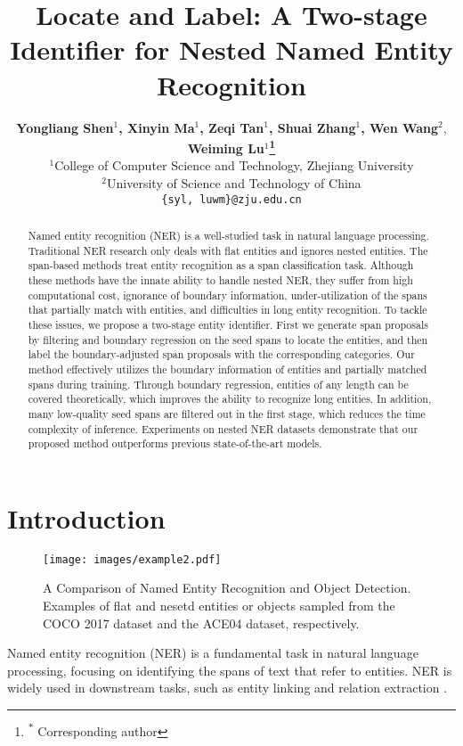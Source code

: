 \documentclass[11pt,a4paper]{article}
\title{Locate and Label: A Two-stage Identifier for Nested Named Entity Recognition}
\author{
\textbf{Yongliang Shen$^{1}$, Xinyin Ma$^{1}$, Zeqi Tan$^{1}$, Shuai Zhang$^{1}$, Wen Wang$^{2}$}, \textbf{Weiming Lu$^{1}$\thanks{\textsuperscript{$\ast$} Corresponding author}}\\
 $^{1}$College of Computer Science and Technology, Zhejiang University \\
 $^{2}$University of Science and Technology of China\\
\texttt{\{syl, luwm\}@zju.edu.cn}
}
\date{}
\begin{document}
\maketitle


\begin{abstract}

Named entity recognition (NER) is a well-studied task in natural language processing. Traditional NER research only deals with flat entities and ignores nested entities. The span-based methods treat entity recognition as a span classification task. Although these methods have the innate ability to handle nested NER, they suffer from high computational cost, ignorance of boundary information, under-utilization of the spans that partially match with entities, and difficulties in long entity recognition. To tackle these issues, we propose a two-stage entity identifier. First we generate span proposals by filtering and boundary regression on the seed spans to locate the entities, and then label the boundary-adjusted span proposals with the corresponding categories. Our method effectively utilizes the boundary information of entities and partially matched spans during training. Through boundary regression, entities of any length can be covered theoretically, which improves the ability to recognize long entities. In addition,  many low-quality seed spans are filtered out in the first stage, which reduces the time complexity of inference. Experiments on nested NER datasets demonstrate that our proposed method outperforms previous state-of-the-art models.


\end{abstract}

\section{Introduction}

\begin{figure}[h]
  \centering
  \texttt{[image: images/example2.pdf]}
  \caption{A Comparison of Named Entity Recognition and Object Detection. Examples of flat and nesetd entities or objects sampled from the COCO 2017 dataset and the ACE04 dataset, respectively.}
   \label{fig:example}
\end{figure}

Named entity recognition (NER) is a fundamental task in natural language processing, focusing on identifying the spans of text that refer to entities. NER is widely used in downstream tasks, such as entity linking \citep{ganea-hofmann-2017-deep, le-titov-2018-improving} and relation extraction \citep{li-ji-2014-incremental, miwa-bansal-2016-end}.
\end{document}
